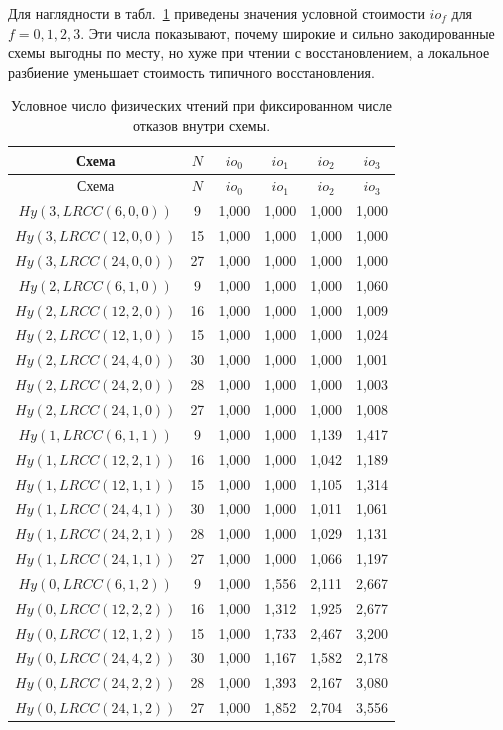 Для наглядности в табл.~\ref{tab:io-fixed-failures} приведены значения
условной стоимости \(io_f\) для \(f=0,1,2,3\). Эти числа показывают, почему
широкие и сильно закодированные схемы выгодны по месту, но хуже при чтении с
восстановлением, а локальное разбиение уменьшает стоимость типичного
восстановления.

\begin{center}
\begin{longtable}{|c|c|c|c|c|c|}
\caption{\label{tab:io-fixed-failures}
Условное число физических чтений при фиксированном числе отказов внутри схемы.}\\
\hline
Схема & \(N\) & \(io_0\) & \(io_1\) & \(io_2\) & \(io_3\) \\
\hline
\endfirsthead
\hline
Схема & \(N\) & \(io_0\) & \(io_1\) & \(io_2\) & \(io_3\) \\
\hline
\endhead
\(Hy(3,LRCC(6,0,0))\) & 9 & 1{,}000 & 1{,}000 & 1{,}000 & 1{,}000 \\
\(Hy(3,LRCC(12,0,0))\) & 15 & 1{,}000 & 1{,}000 & 1{,}000 & 1{,}000 \\
\(Hy(3,LRCC(24,0,0))\) & 27 & 1{,}000 & 1{,}000 & 1{,}000 & 1{,}000 \\
\(Hy(2,LRCC(6,1,0))\) & 9 & 1{,}000 & 1{,}000 & 1{,}000 & 1{,}060 \\
\(Hy(2,LRCC(12,2,0))\) & 16 & 1{,}000 & 1{,}000 & 1{,}000 & 1{,}009 \\
\(Hy(2,LRCC(12,1,0))\) & 15 & 1{,}000 & 1{,}000 & 1{,}000 & 1{,}024 \\
\(Hy(2,LRCC(24,4,0))\) & 30 & 1{,}000 & 1{,}000 & 1{,}000 & 1{,}001 \\
\(Hy(2,LRCC(24,2,0))\) & 28 & 1{,}000 & 1{,}000 & 1{,}000 & 1{,}003 \\
\(Hy(2,LRCC(24,1,0))\) & 27 & 1{,}000 & 1{,}000 & 1{,}000 & 1{,}008 \\
\(Hy(1,LRCC(6,1,1))\) & 9 & 1{,}000 & 1{,}000 & 1{,}139 & 1{,}417 \\
\(Hy(1,LRCC(12,2,1))\) & 16 & 1{,}000 & 1{,}000 & 1{,}042 & 1{,}189 \\
\(Hy(1,LRCC(12,1,1))\) & 15 & 1{,}000 & 1{,}000 & 1{,}105 & 1{,}314 \\
\(Hy(1,LRCC(24,4,1))\) & 30 & 1{,}000 & 1{,}000 & 1{,}011 & 1{,}061 \\
\(Hy(1,LRCC(24,2,1))\) & 28 & 1{,}000 & 1{,}000 & 1{,}029 & 1{,}131 \\
\(Hy(1,LRCC(24,1,1))\) & 27 & 1{,}000 & 1{,}000 & 1{,}066 & 1{,}197 \\
\(Hy(0,LRCC(6,1,2))\) & 9 & 1{,}000 & 1{,}556 & 2{,}111 & 2{,}667 \\
\(Hy(0,LRCC(12,2,2))\) & 16 & 1{,}000 & 1{,}312 & 1{,}925 & 2{,}677 \\
\(Hy(0,LRCC(12,1,2))\) & 15 & 1{,}000 & 1{,}733 & 2{,}467 & 3{,}200 \\
\(Hy(0,LRCC(24,4,2))\) & 30 & 1{,}000 & 1{,}167 & 1{,}582 & 2{,}178 \\
\(Hy(0,LRCC(24,2,2))\) & 28 & 1{,}000 & 1{,}393 & 2{,}167 & 3{,}080 \\
\(Hy(0,LRCC(24,1,2))\) & 27 & 1{,}000 & 1{,}852 & 2{,}704 & 3{,}556 \\
\hline


\end{longtable}
\end{center}
